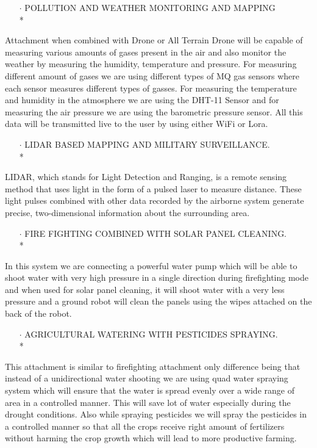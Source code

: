 \documentclass[12pt]{article}
\begin{document}
\begin{itemize}
\item[$\cdot$] POLLUTION AND WEATHER MONITORING AND MAPPING \\*
\end{itemize}
Attachment when combined with Drone or All Terrain Drone will be capable of measuring various amounts of gases present in the air and also monitor the weather by measuring the humidity, temperature and pressure. For measuring different amount of gases we are using different types of MQ gas sensors where each sensor measures different types of gasses. For measuring the temperature and humidity in the atmosphere we are using the DHT-11 Sensor and for measuring the air pressure we are using the barometric pressure sensor. All this data will be transmitted live to the user by using either WiFi or Lora.


\begin{itemize}
\item[$\cdot$] LIDAR BASED MAPPING AND MILITARY SURVEILLANCE. \\*
\end{itemize}
LIDAR, which stands for Light Detection and Ranging, is a remote sensing method that uses light in the form of a pulsed laser to measure distance. These light pulses combined with other data recorded by the airborne system generate precise, two-dimensional information about the surrounding area. 

\begin{itemize}
\item[$\cdot$] FIRE FIGHTING COMBINED WITH SOLAR PANEL CLEANING. \\*
\end{itemize}
In this system we are connecting a powerful water pump which will be able to shoot water with very high pressure in a single direction during firefighting mode and when used for solar panel cleaning, it will shoot water with a very less pressure and a ground robot will clean the panels using the wipes attached on the back of the robot.

\begin{itemize}
\item[$\cdot$] AGRICULTURAL WATERING WITH PESTICIDES SPRAYING. \\*
\end{itemize}
This attachment is similar to firefighting attachment only difference being that instead of a unidirectional water shooting we are using quad water spraying system which will ensure that the water is spread evenly over a wide range of area in a controlled manner. This will save lot of water especially during the drought conditions. Also while spraying pesticides we will spray the pesticides in a controlled manner so that all the crops receive right amount of fertilizers without harming the crop growth which will lead to more productive farming.
\end{document}

